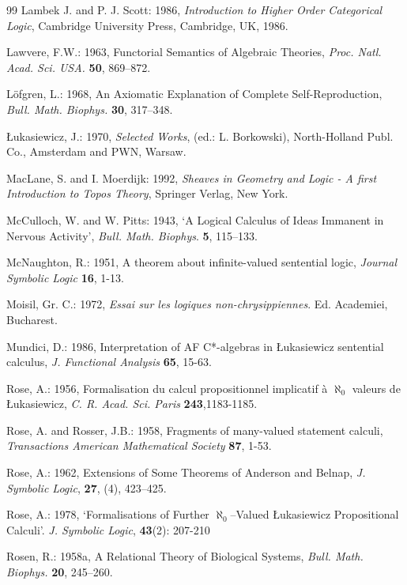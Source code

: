 \documentclass[12pt]{article}
\theoremstyle{plain}
\theoremstyle{definition}
\begin{document}
\begin{thebibliography} {99}
Lambek J. and P. J. Scott: 1986, \emph{Introduction to Higher Order Categorical Logic}, Cambridge University
Press, Cambridge, UK, 1986.

Lawvere, F.W.: 1963, Functorial Semantics of Algebraic Theories, \emph{Proc. Natl. Acad. Sci. USA.}
\textbf{50}, 869--872.

L\"{o}fgren, L.: 1968, An Axiomatic Explanation of Complete Self-Reproduction,\emph{ Bull. Math. Biophys.}
\textbf{30}, 317--348.

\L{}ukasiewicz, J.: 1970, \emph{Selected Works}, (ed.: L. Borkowski), North-Holland Publ. Co., Amsterdam and PWN,
Warsaw.

MacLane, S. and I. Moerdijk: 1992, \emph{Sheaves in Geometry and Logic - A first Introduction to Topos Theory},
Springer Verlag, New York.

McCulloch, W. and W. Pitts: 1943, `A Logical Calculus of Ideas Immanent in Nervous Activity', \emph{Bull. Math.
Biophys}. \textbf{5}, 115--133.

McNaughton, R.: 1951, A theorem about infinite-valued sentential logic, \emph{Journal Symbolic Logic}
\textbf{16}, 1-13.

Moisil, Gr. C.: 1972, \emph{Essai sur les logiques non-chrysippiennes}. Ed. Academiei, Bucharest.

Mundici, D.: 1986, Interpretation of AF C*-algebras in \L{}ukasiewicz sentential calculus, \emph{J. Functional
Analysis} \textbf{65}, 15-63.

Rose, A.: 1956, Formalisation du calcul propositionnel implicatif \`a $\aleph_0$ valeurs de \L{}ukasiewicz,
\emph{C. R. Acad. Sci. Paris} \textbf{243},1183-1185.

Rose, A. and Rosser, J.B.: 1958, Fragments of many-valued statement calculi, \emph{Transactions American
Mathematical Society} \textbf{87}, 1-53.

Rose, A.: 1962, Extensions of Some Theorems of Anderson and Belnap, \emph{J. Symbolic Logic}, \textbf{27},
(4), 423--425.

Rose, A.: 1978, `Formalisations of Further $\aleph_0$--Valued \L{}ukasiewicz Propositional Calculi'. \emph{J. Symbolic
Logic}, \textbf{43}(2): 207-210

Rosen, R.: 1958a, A Relational Theory of Biological Systems, \emph{Bull. Math. Biophys.} \textbf{20},
245--260.


\end{thebibliography}
\end{document}
